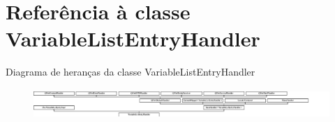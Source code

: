 \hypertarget{class_variable_list_entry_handler}{\section{Referência à classe Variable\-List\-Entry\-Handler}
\label{class_variable_list_entry_handler}
}
Diagrama de heranças da classe Variable\-List\-Entry\-Handler\begin{figure}[H]
\begin{center}
\leavevmode
\includegraphics[height=1.167883cm]{class_variable_list_entry_handler}
\end{center}
\end{figure}
